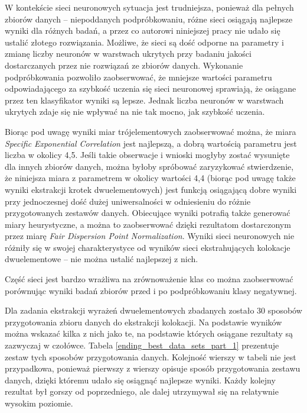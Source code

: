 W kontekście sieci neuronowych sytuacja jest trudniejsza, ponieważ dla pełnych zbiorów danych -- niepoddanych podpróbkowaniu, różne sieci osiągają najlepsze wyniki dla różnych badań, a przez co autorowi niniejszej pracy nie udało się ustalić złotego rozwiązania.
Możliwe, że sieci są dość odporne na parametry i zmianę liczby neuronów w warstwach ukrytych przy badaniu jakości dostarczanych przez nie rozwiązań ze zbiorów danych.
Wykonanie podpróbkowania pozwoliło zaobserwować, że mniejsze wartości parametru odpowiadającego za szybkość uczenia się sieci neuronowej sprawiają, że osiągane przez ten klasyfikator wyniki są lepsze.
Jednak liczba neuronów w warstwach ukrytych zdaje się nie wpływać na nie tak mocno, jak szybkość uczenia.

\par
Biorąc pod uwagę wyniki miar trójelementowych zaobserwować można, że miara \emph{Specific Exponential Correlation} jest najlepszą, a dobrą wartością parametru jest liczba w okolicy 4,5.
Jeśli takie obserwacje i wnioski mogłyby zostać wysunięte dla innych zbiorów danych, można byłoby spróbować zaryzykować stwierdzenie, że niniejsza miara z parametrem w okolicy wartości 4,4 (biorąc pod uwagę także wyniki ekstrakcji krotek dwuelementowych) jest funkcją osiągającą dobre wyniki przy jednoczesnej dość dużej uniwersalności w odniesieniu do różnie przygotowanych zestawów danych.
Obiecujące wyniki potrafią także generować miary heurystyczne, a można to zaobserwować dzięki rezultatom dostarczonym przez miarę \emph{Fair Dispersion Point Normalization}.
Wyniki sieci neuronowych nie różniły się w swojej charakterystyce od wyników sieci ekstrahujących kolokacje dwuelementowe -- nie można ustalić najlepszej z nich.

\par
Część sieci jest bardzo wrażliwa na zrównoważenie klas co można zaobserwować porównując wyniki badań zbiorów przed i po podpróbkowaniu klasy negatywnej.

\par
Dla zadania ekstrakcji wyrażeń dwuelementowych zbadanych zostało 30 sposobów przygotowania zbioru danych do ekstrakcji kolokacji.
Na podstawie wyników można wskazać kilka z nich jako te, na podstawie których osiągane rezultaty są zazwyczaj w czołówce.
Tabela \ref{ending_best_data_sets_part_1} prezentuje zestaw tych sposobów przygotowania danych.
Kolejność wierszy w tabeli nie jest przypadkowa, ponieważ pierwszy z wierszy opisuje sposób przygotowania zestawu danych, dzięki któremu udało się osiągnąć najlepsze wyniki.
Każdy kolejny rezultat był gorszy od poprzedniego, ale dalej utrzymywał się na relatywnie wysokim poziomie.

